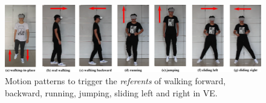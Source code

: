 \documentclass[review]{vgtc}                 %
\begin{document}



\begin{figure}
	\centering
	\includegraphics[width=\textwidth]{figs/gestures.png}
	\caption{Motion patterns to trigger the \emph{referents} of walking forward, backward, running, jumping, sliding left and right in VE.}
	\label{fig:gestures}
\end{figure}
\end{document}
